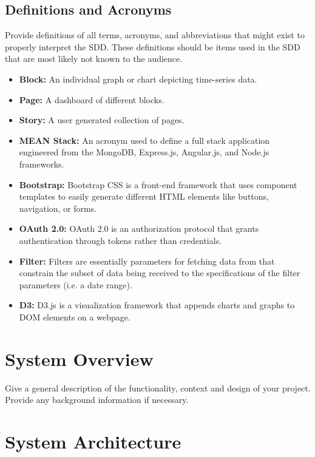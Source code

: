 \documentclass[journal,10pt,onecolumn,compsoc]{IEEEtran}
\begin{document}
    \subsection{Definitions and Acronyms}
    Provide definitions of all terms, acronyms, and abbreviations that might exist to
    properly interpret the SDD. These definitions should be items used in the SDD that
    are most likely not known to the audience. 
    \begin{itemize}
        \item \textbf{Block:} An individual graph or chart depicting time-series data.
        \item \textbf{Page:} A dashboard of different blocks.
        \item \textbf{Story:} A user generated collection of pages.
        \item \textbf{MEAN Stack:} An acronym used to define a full stack application engineered from the MongoDB, Express.js, Angular.js, and Node.js frameworks.
        \item \textbf{Bootstrap:} Bootstrap CSS is a front-end framework that uses component templates to easily generate different HTML elements like buttons, navigation, or forms.
        \item \textbf{OAuth 2.0:} OAuth 2.0 is an authorization protocol that grants authentication through tokens rather than credentials.
        \item \textbf{Filter:} Filters are essentially parameters for fetching data from that constrain the subset of data being received to the specifications of the filter parameters (i.e. a date range).
        \item \textbf{D3:} D3.js is a visualization framework that appends charts and graphs to DOM elements on a webpage.

    \end{itemize}
    \section{System Overview}
    Give a general description of the functionality, context and design of your project.
    Provide any background information if necessary. 
    \section{System Architecture}
\end{document}
